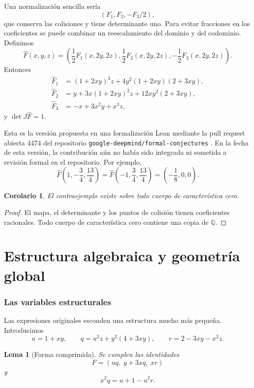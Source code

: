 \documentclass[11pt]{article}
\newtheorem{lemma}[theorem]{Lema}
\newtheorem{corollary}[theorem]{Corolario}
\theoremstyle{definition}
\theoremstyle{remark}
\newcommand{\Q}{\mathbb{Q}}
\begin{document}
Una normalizaci\'on sencilla ser\'ia
\[
(F_1,F_2,-F_3/2),
\]
que conserva las colisiones y tiene determinante uno. Para evitar fracciones
en los coeficientes se puede combinar un reescalamiento del dominio y del
codominio. Definimos
\[
\widehat F(x,y,z)=
\left(
\frac12F_1(x,2y,2z),
\frac12F_2(x,2y,2z),
-\frac12F_3(x,2y,2z)
\right).
\]
Entonces
\begin{align*}
\widehat F_1&=(1+2xy)^3z+4y^2(1+2xy)(2+3xy),\\
\widehat F_2&=y+3x(1+2xy)^2z+12xy^2(2+3xy),\\
\widehat F_3&=-x+3x^2y+x^3z,
\end{align*}
y $\det J\widehat F=1$.

Esta es la versi\'on propuesta en una formalizaci\'on Lean mediante la pull
request abierta 4474 del repositorio
\texttt{google-deepmind/formal-conjectures} \cite{LezeauLean2026}. En la fecha
de esta versi\'on, la contribuci\'on a\'un no hab\'ia sido integrada ni sometida
a revisi\'on formal en el repositorio. Por ejemplo,
\[
\widehat F\left(1,-\frac34,\frac{13}{4}\right)
=
\widehat F\left(-1,\frac34,\frac{13}{4}\right)
=\left(-\frac18,0,0\right).
\]

\begin{corollary}
El contraejemplo existe sobre todo cuerpo de caracter\'istica cero.
\end{corollary}

\begin{proof}
El mapa, el determinante y los puntos de colisi\'on tienen coeficientes
racionales. Todo cuerpo de caracter\'istica cero contiene una copia de $\Q$.
\end{proof}

\clearpage
\part{Estructura algebraica y geometr\'ia global}

\section{Las variables estructurales}\label{sec:structure}

Las expresiones originales esconden una estructura mucho m\'as peque\~na.
Introducimos
\begin{equation}\label{eq:uqr}
u=1+xy,\qquad
q=u^2z+y^2(4+3xy),\qquad
r=2-3xy-x^2z.
\end{equation}

\begin{lemma}[Forma comprimida]\label{lem:compressed}
Se cumplen las identidades
\begin{equation}\label{eq:Fcompressed}
F=(uq,\;y+3xq,\;xr)
\end{equation}
y
\begin{equation}\label{eq:keyidentity}
x^2q=u+1-u^2r.
\end{equation}
\end{lemma}
\end{document}
